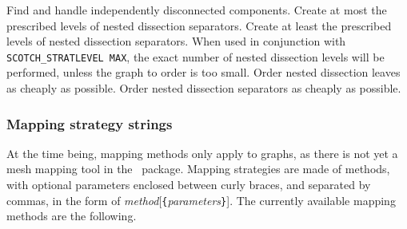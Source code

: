 \begin{itemize}
Find and handle independently disconnected components.
Create at most the prescribed levels of nested dissection separators.
Create at least the prescribed levels of nested dissection separators.
When used in conjunction with {\tt SCOTCH\_\lbt STRAT\lbt LEVEL\lbt
MAX}, the exact number of nested dissection levels will be performed,
unless the graph to order is too small.
Order nested dissection leaves as cheaply as possible.
Order nested dissection separators as cheaply as possible.
\end{itemize}

\subsubsection{Mapping strategy strings}
\label{sec-lib-format-map}

At the time being, mapping methods only apply to graphs, as there is
not yet a mesh mapping tool in the \scotch\ package.
Mapping strategies are made of methods, with optional parameters enclosed
between curly braces, and separated by commas, in the form of
{\it method\/}{[{\tt \{}{\it parameters\/}{\tt \}}]}\enspace.
The currently available mapping methods are the following.

